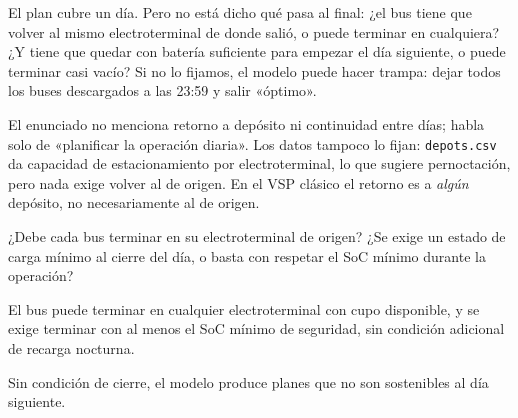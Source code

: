 \documentclass[11pt,a4paper,parskip=half]{scrartcl}
\begin{document}
\begin{campos}
\item[En simple] El plan cubre un día. Pero no está dicho qué pasa al final: ¿el bus tiene que volver al mismo electroterminal de donde salió, o puede terminar en cualquiera? ¿Y tiene que quedar con batería suficiente para empezar el día siguiente, o puede terminar casi vacío? Si no lo fijamos, el modelo puede hacer trampa: dejar todos los buses descargados a las 23:59 y salir «óptimo».
\item[Evidencia] El enunciado no menciona retorno a depósito ni continuidad entre días; habla solo de «planificar la operación diaria». Los datos tampoco lo fijan: \texttt{depots.csv} da capacidad de estacionamiento por electroterminal, lo que sugiere pernoctación, pero nada exige volver al de origen. En el VSP clásico \citep{bunte_vspoverview_2009} el retorno es a \emph{algún} depósito, no necesariamente al de origen.
\item[Pregunta] ¿Debe cada bus terminar en su electroterminal de origen? ¿Se exige un estado de carga mínimo al cierre del día, o basta con respetar el SoC mínimo durante la operación?
\item[Supuesto] El bus puede terminar en cualquier electroterminal con cupo disponible, y se exige terminar con al menos el SoC mínimo de seguridad, sin condición adicional de recarga nocturna.
\item[Impacto] Sin condición de cierre, el modelo produce planes que no son sostenibles al día siguiente.
\end{campos}
\end{document}
